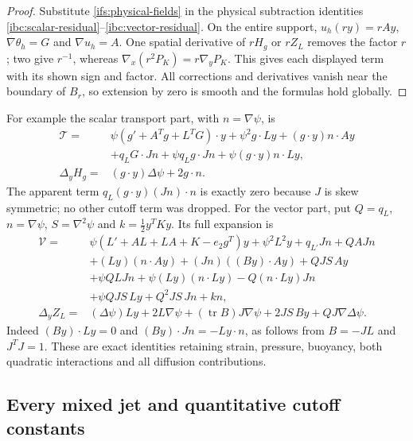 \begin{proof}
Substitute \eqref{ifs:physical-fields} in the physical subtraction
identities \eqref{ibc:scalar-residual}--\eqref{ibc:vector-residual}.
On the entire support, $u_h(ry)=rAy$,
$\nabla\theta_h=G$ and $\nabla u_h=A$.
One spatial derivative of $rH_g$ or $rZ_L$ removes the factor $r$;
two give $r^{-1}$, whereas $\nabla_x(r^2P_K)=r\nabla_yP_K$.
This gives each displayed term with its shown sign and factor.
All corrections and derivatives vanish near the boundary of $B_r$,
so extension by zero is smooth and the formulas hold globally.
\end{proof}

For example the scalar transport part, with $n=\nabla\psi$, is
\begin{align}
 \mathcal T
 ={}&\psi(g'+A^Tg+L^TG)\cdot y
       +\psi^2 g\cdot Ly+(g\cdot y)n\cdot Ay\nonumber\\
    &+q_L G\cdot Jn+\psi q_Lg\cdot Jn
       +\psi(g\cdot y)n\cdot Ly, \label{ifs:expanded-scalar}\\
 \Delta_yH_g
 ={}&(g\cdot y)\Delta\psi+2g\cdot n. \nonumber
\end{align}
The apparent term $q_L(g\cdot y)(Jn)\cdot n$ is exactly zero
because $J$ is skew symmetric; no other cutoff term was dropped.
For the vector part, put $Q=q_L$, $n=\nabla\psi$,
$S=\nabla^2\psi$ and $k=\tfrac12y^TKy$.  Its full expansion is
\begin{align}
 \mathcal V={}&\psi(L'+AL+LA+K-e_2g^T)y+\psi^2L^2y
       +q_{L'}Jn+QAJn\nonumber\\
 &+(Ly)(n\cdot Ay)+(Jn)((By)\cdot Ay)+QJS\,Ay\nonumber\\
 &+\psi QLJn+\psi(Ly)(n\cdot Ly)
       -Q(n\cdot Ly)Jn\nonumber\\
 &+\psi QJS\,Ly+Q^2JS\,Jn+kn,\label{ifs:expanded-vector}\\
 \Delta_y Z_L={}&(\Delta\psi)Ly+2L\nabla\psi
       +(\operatorname{tr}B)J\nabla\psi
       +2JS\,By+QJ\nabla\Delta\psi. \nonumber
\end{align}
Indeed $(By)\cdot Ly=0$ and $(By)\cdot Jn=-Ly\cdot n$,
as follows from $B=-JL$ and $J^TJ=1$.
These are exact identities retaining strain, pressure, buoyancy,
both quadratic interactions and all diffusion contributions.

\subsection{Every mixed jet and quantitative cutoff constants}

